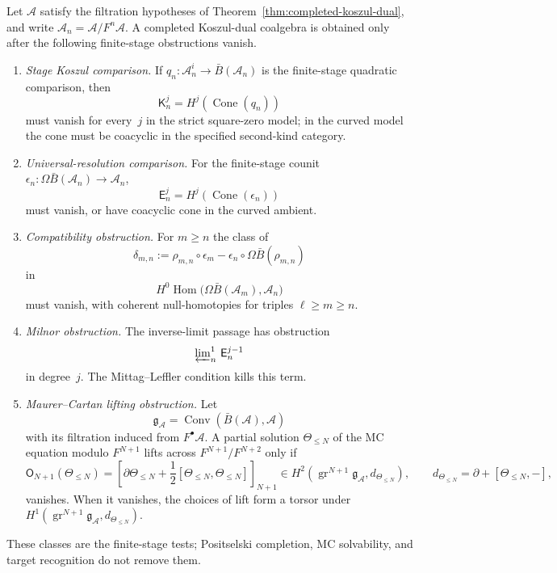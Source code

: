 \begin{proposition}
\label{prop:finite-stage-obstruction-classes}
Let $\mathcal A$ satisfy the filtration hypotheses of
Theorem~\ref{thm:completed-koszul-dual}, and write
$\mathcal A_n=\mathcal A/F^n\mathcal A$. A completed Koszul-dual
coalgebra is obtained only after the following finite-stage
obstructions vanish.
\begin{enumerate}
\item \emph{Stage Koszul comparison.} If
 $q_n\colon\mathcal A_n^i\to\bar B(\mathcal A_n)$ is the finite-stage
 quadratic comparison, then
 \[
 \mathsf K_n^j=H^j(\operatorname{Cone}(q_n))
 \]
 must vanish for every~$j$ in the strict square-zero model; in the
 curved model the cone must be coacyclic in the specified second-kind
 category.
\item \emph{Universal-resolution comparison.} For the finite-stage counit
 $\epsilon_n\colon\Omega\bar B(\mathcal A_n)\to\mathcal A_n$,
 \[
 \mathsf E_n^j=H^j(\operatorname{Cone}(\epsilon_n))
 \]
 must vanish, or have coacyclic cone in the curved ambient.
\item \emph{Compatibility obstruction.} For $m\ge n$ the class of
 \[
 \delta_{m,n}:=
 \rho_{m,n}\circ\epsilon_m
 -\epsilon_n\circ\Omega\bar B(\rho_{m,n})
 \]
 in
 \[
 H^0\operatorname{Hom}\bigl(
 \Omega\bar B(\mathcal A_m),\mathcal A_n\bigr)
 \]
 must vanish, with coherent null-homotopies for triples
 $\ell\ge m\ge n$.
\item \emph{Milnor obstruction.} The inverse-limit passage has
 obstruction
 \[
 \varprojlim\nolimits^1_n\,\mathsf E_n^{j-1}
 \]
 in degree~$j$. The Mittag--Leffler condition kills this term.
\item \emph{Maurer--Cartan lifting obstruction.} Let
 \[
 \mathfrak g_{\mathcal A}
 =\operatorname{Conv}(\bar B(\mathcal A),\mathcal A)
 \]
 with its filtration induced from $F^\bullet\mathcal A$. A partial
 solution $\Theta_{\le N}$ of the MC equation modulo $F^{N+1}$ lifts
 across $F^{N+1}/F^{N+2}$ only if
 \[
 \mathsf O_{N+1}(\Theta_{\le N})
 =
	 \left[
	 \partial\Theta_{\le N}
	 +\frac12[\Theta_{\le N},\Theta_{\le N}]
	 \right]_{N+1}
	 \in H^2\!\left(
	 \operatorname{gr}^{N+1}\mathfrak g_{\mathcal A},
	 d_{\Theta_{\le N}}
	 \right),
	 \qquad
	 d_{\Theta_{\le N}}=\partial+[\Theta_{\le N},-],
	 \]
	 vanishes. When it vanishes, the choices of lift form a torsor under
	 $H^1(\operatorname{gr}^{N+1}\mathfrak g_{\mathcal A},
	 d_{\Theta_{\le N}})$.
\end{enumerate}
These classes are the finite-stage tests; Positselski completion,
MC solvability, and target recognition do not remove them.
\end{proposition}

